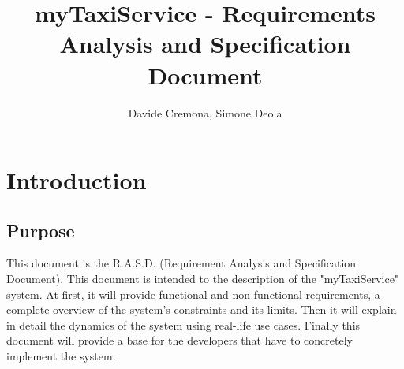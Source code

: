 \documentclass{report}
\begin{document}
\title{myTaxiService - Requirements Analysis and Specification Document}
\author{Davide Cremona, Simone Deola}
\maketitle


\section{Introduction}
\subsection{Purpose}
This document is the R.A.S.D. (Requirement Analysis and Specification Document).
This document is intended to the description of the "myTaxiService" system. 
At first, it will provide functional and non-functional requirements, a complete overview of the system's constraints and its limits. Then it will explain in detail the dynamics of the system using real-life use cases.
Finally this document will provide a base for the developers that have to concretely implement the system.

\printindex
\end{document}
